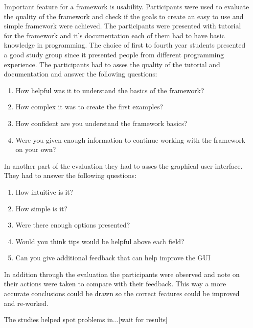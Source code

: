 Important feature for a framework is usability. Participants were used to evaluate the quality of the framework and check if the goals
to create an easy to use and simple framework were achieved. The participants were presented with tutorial for the framework and it's documentation
each of them had to have basic knowledge in programming. The choice of first to fourth year students presented a good study group since it presented people
from different programming experience. The participants had to asses the quality of the 
tutorial and documentation and answer the following questions:

\begin{enumerate}
\item How helpful was it to understand the basics of the framework?
\item How complex it was to create the first examples?
\item How confident are you understand the framework basics? 
\item Were you given enough information to continue working with the framework on your own?
\end{enumerate}
 
In another part of the evaluation they had to asses the graphical user interface. They had to answer the following questions: 

\begin{enumerate}
\item How intuitive is it?
\item How simple is it?
\item Were there enough options presented?
\item Would you think tips would be helpful above each field?
\item Can you give additional feedback that can help improve the GUI
\end{enumerate}

In addition through the evaluation the participants were observed and note on their actions were taken to compare with their feedback. This way a more
accurate conclusions could be drawn so the correct features could be improved and re-worked.

The studies helped spot problems in...[wait for results] 
